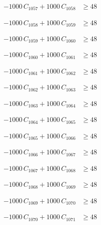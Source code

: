 \documentclass[a4paper,11pt]{article}
\begin{document}
\begin{align}
-1000\,C_{1057} + 1000\,C_{1058} &\geq 48 \nonumber
\end{align}

\begin{align}
-1000\,C_{1058} + 1000\,C_{1059} &\geq 48 \nonumber
\end{align}

\begin{align}
-1000\,C_{1059} + 1000\,C_{1060} &\geq 48 \nonumber
\end{align}

\begin{align}
-1000\,C_{1060} + 1000\,C_{1061} &\geq 48 \nonumber
\end{align}

\begin{align}
-1000\,C_{1061} + 1000\,C_{1062} &\geq 48 \nonumber
\end{align}

\begin{align}
-1000\,C_{1062} + 1000\,C_{1063} &\geq 48 \nonumber
\end{align}

\begin{align}
-1000\,C_{1063} + 1000\,C_{1064} &\geq 48 \nonumber
\end{align}

\begin{align}
-1000\,C_{1064} + 1000\,C_{1065} &\geq 48 \nonumber
\end{align}

\begin{align}
-1000\,C_{1065} + 1000\,C_{1066} &\geq 48 \nonumber
\end{align}

\begin{align}
-1000\,C_{1066} + 1000\,C_{1067} &\geq 48 \nonumber
\end{align}

\begin{align}
-1000\,C_{1067} + 1000\,C_{1068} &\geq 48 \nonumber
\end{align}

\begin{align}
-1000\,C_{1068} + 1000\,C_{1069} &\geq 48 \nonumber
\end{align}

\begin{align}
-1000\,C_{1069} + 1000\,C_{1070} &\geq 48 \nonumber
\end{align}

\begin{align}
-1000\,C_{1070} + 1000\,C_{1071} &\geq 48 \nonumber
\end{align}
\end{document}
